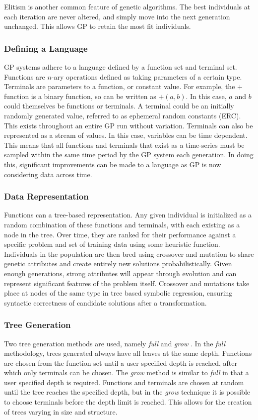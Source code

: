 \documentclass[12pt, letterpaper]{article}
\begin{document}
\textrm{ \indent Elitism is another common feature of genetic algorithms. The best individuals at each iteration are never altered, and simply move into the next generation unchanged. This allows GP to retain the most fit individuals. }

\subsubsection{Defining a Language}
\textrm{ \indent GP systems adhere to a language defined by a function set and terminal set. Functions are $n$-ary operations defined as taking parameters of a certain type. Terminals are parameters to a function, or constant value. For example, the $+$ function is a binary function, so can be written as $ +(a, b) $. In this case, $a$ and $b$ could themselves be functions or terminals. A terminal could be an initially randomly generated value, referred to as ephemeral random constants (ERC). This exists throughout an entire GP run without variation. Terminals can also be represented as a stream of values. In this case, variables can be time dependent. This means that all functions and terminals that exist as a time-series must be sampled within the same time period by the GP system each generation. In doing this, significant improvements can be made to a language as GP is now considering data across time.}

\subsubsection{Data Representation}
\textrm{ \indent Functions can a tree-based representation. Any given individual is initialized as a random combination of these functions and terminals, with each existing as a node in the tree. Over time, they are ranked for their performance against a specific problem and set of training data using some heuristic function. Individuals in the population are then bred using crossover and mutation to share genetic attributes and create entirely new solutions probabilistically. Given enough generations, strong attributes will appear through evolution and can represent significant features of the problem itself. Crossover and mutations take place at nodes of the same type in tree based symbolic regression, ensuring syntactic correctness of candidate solutions after a transformation. }

\subsubsection{Tree Generation}
\textrm{ \indent Two tree generation methods are used, namely \textit{full} and \textit{grow} \cite{fieldguide}. In the \textit{full} methodology, trees generated always have all leaves at the same depth. Functions are chosen from the function set until a user specified depth is reached, after which only terminals can be chosen. The \textit{grow} method is similar to \textit{full} in that a user specified depth is required. Functions and terminals are chosen at random until the tree reaches the specified depth, but in the \textit{grow} technique it is possible to choose terminals before the depth limit is reached. This allows for the creation of trees varying in size and structure. }
\end{document}
